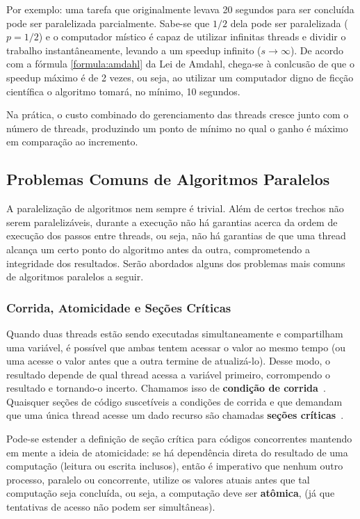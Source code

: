 \documentclass{article}
\begin{document}
Por exemplo: uma tarefa que originalmente levava 20 segundos para ser concluída pode ser paralelizada parcialmente. Sabe-se que $1/2$ dela pode ser paralelizada ($p=1/2$) e o computador místico é capaz de utilizar infinitas threads e dividir o trabalho instantâneamente, levando a um speedup infinito ($s \to \infty$). De acordo com a fórmula \ref{formula:amdahl} da Lei de Amdahl, chega-se à conlcusão de que o speedup máximo é de 2 vezes, ou seja, ao utilizar um computador digno de ficção científica o algoritmo tomará, no mínimo, 10 segundos.

Na prática, o custo combinado do gerenciamento das threads cresce junto com o número de threads, produzindo um ponto de mínimo no qual o ganho é máximo em comparação ao incremento.

\subsection{Problemas Comuns de Algoritmos Paralelos}
\label{ssec:problemas comuns}

A paralelização de algoritmos nem sempre é trivial. Além de certos trechos não serem paralelizáveis, durante a execução não há garantias acerca da ordem de execução dos passos entre threads, ou seja, não há garantias de que uma thread alcança um certo ponto do algoritmo antes da outra, comprometendo a integridade dos resultados. Serão abordados alguns dos problemas mais comuns de algoritmos paralelos a seguir.

\subsubsection{Corrida, Atomicidade e Seções Críticas}
\label{sssec:corrida atomicidade e secoes criticas}

Quando duas threads estão sendo executadas simultaneamente e compartilham uma variável, é possível que ambas tentem acessar o valor ao mesmo tempo (ou uma acesse o valor antes que a outra termine de atualizá-lo). Desse modo, o resultado depende de qual thread acessa a variável primeiro, corrompendo o resultado e tornando-o incerto. Chamamos isso de \textbf{condição de corrida}~\cite{pacheco11}. Quaisquer seções de código suscetíveis a condições de corrida e que demandam que uma única thread acesse um dado recurso são chamadas \textbf{seções críticas}~\cite{pacheco11}.

Pode-se estender a definição de seção crítica para códigos concorrentes mantendo em mente a ideia de atomicidade: se há dependência direta do resultado de uma computação (leitura ou escrita inclusos), então é imperativo que nenhum outro processo, paralelo ou concorrente, utilize os valores atuais antes que tal computação seja concluída, ou seja, a computação deve ser \textbf{atômica}, (já que tentativas de acesso não podem ser simultâneas).
\end{document}
